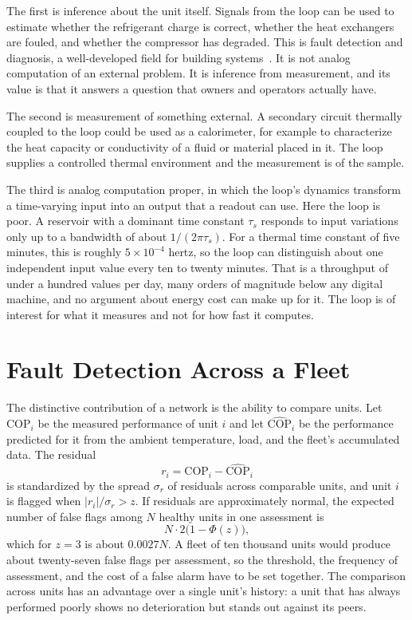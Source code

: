 The first is inference about the unit itself. Signals from the loop can be used to estimate whether the refrigerant charge is correct, whether the heat exchangers are fouled, and whether the compressor has degraded. This is fault detection and diagnosis, a well-developed field for building systems~\cite{katipamula2005}. It is not analog computation of an external problem. It is inference from measurement, and its value is that it answers a question that owners and operators actually have.

The second is measurement of something external. A secondary circuit thermally coupled to the loop could be used as a calorimeter, for example to characterize the heat capacity or conductivity of a fluid or material placed in it. The loop supplies a controlled thermal environment and the measurement is of the sample.

The third is analog computation proper, in which the loop's dynamics transform a time-varying input into an output that a readout can use. Here the loop is poor. A reservoir with a dominant time constant $\tau_s$ responds to input variations only up to a bandwidth of about $1/(2\pi\tau_s)$. For a thermal time constant of five minutes, this is roughly $5\times10^{-4}$ hertz, so the loop can distinguish about one independent input value every ten to twenty minutes. That is a throughput of under a hundred values per day, many orders of magnitude below any digital machine, and no argument about energy cost can make up for it. The loop is of interest for what it measures and not for how fast it computes.

\section{Fault Detection Across a Fleet}

The distinctive contribution of a network is the ability to compare units. Let $\mathrm{COP}_i$ be the measured performance of unit $i$ and let $\widehat{\mathrm{COP}}_i$ be the performance predicted for it from the ambient temperature, load, and the fleet's accumulated data. The residual
\[
r_i=\mathrm{COP}_i-\widehat{\mathrm{COP}}_i
\]
is standardized by the spread $\sigma_r$ of residuals across comparable units, and unit $i$ is flagged when $|r_i|/\sigma_r>z$. If residuals are approximately normal, the expected number of false flags among $N$ healthy units in one assessment is
\[
N\cdot2\bigl(1-\Phi(z)\bigr),
\]
which for $z=3$ is about $0.0027N$. A fleet of ten thousand units would produce about twenty-seven false flags per assessment, so the threshold, the frequency of assessment, and the cost of a false alarm have to be set together. The comparison across units has an advantage over a single unit's history: a unit that has always performed poorly shows no deterioration but stands out against its peers.


